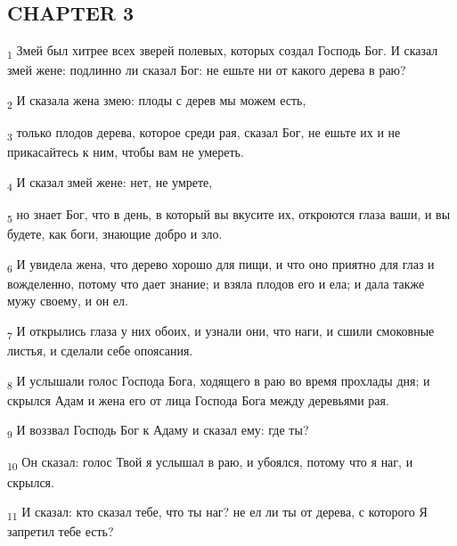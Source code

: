 \subsection{CHAPTER 3}
\begin{tcolorbox}
\textsubscript{1} Змей был хитрее всех зверей полевых, которых создал Господь Бог. И сказал змей жене: подлинно ли сказал Бог: не ешьте ни от какого дерева в раю?
\end{tcolorbox}
\begin{tcolorbox}
\textsubscript{2} И сказала жена змею: плоды с дерев мы можем есть,
\end{tcolorbox}
\begin{tcolorbox}
\textsubscript{3} только плодов дерева, которое среди рая, сказал Бог, не ешьте их и не прикасайтесь к ним, чтобы вам не умереть.
\end{tcolorbox}
\begin{tcolorbox}
\textsubscript{4} И сказал змей жене: нет, не умрете,
\end{tcolorbox}
\begin{tcolorbox}
\textsubscript{5} но знает Бог, что в день, в который вы вкусите их, откроются глаза ваши, и вы будете, как боги, знающие добро и зло.
\end{tcolorbox}
\begin{tcolorbox}
\textsubscript{6} И увидела жена, что дерево хорошо для пищи, и что оно приятно для глаз и вожделенно, потому что дает знание; и взяла плодов его и ела; и дала также мужу своему, и он ел.
\end{tcolorbox}
\begin{tcolorbox}
\textsubscript{7} И открылись глаза у них обоих, и узнали они, что наги, и сшили смоковные листья, и сделали себе опоясания.
\end{tcolorbox}
\begin{tcolorbox}
\textsubscript{8} И услышали голос Господа Бога, ходящего в раю во время прохлады дня; и скрылся Адам и жена его от лица Господа Бога между деревьями рая.
\end{tcolorbox}
\begin{tcolorbox}
\textsubscript{9} И воззвал Господь Бог к Адаму и сказал ему: где ты?
\end{tcolorbox}
\begin{tcolorbox}
\textsubscript{10} Он сказал: голос Твой я услышал в раю, и убоялся, потому что я наг, и скрылся.
\end{tcolorbox}
\begin{tcolorbox}
\textsubscript{11} И сказал: кто сказал тебе, что ты наг? не ел ли ты от дерева, с которого Я запретил тебе есть?
\end{tcolorbox}
